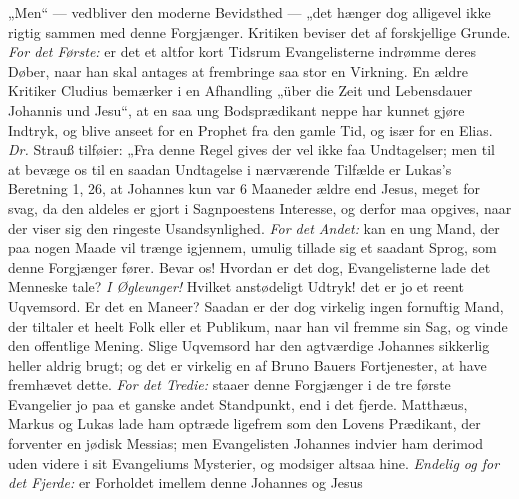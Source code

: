 \documentclass[12pt,a4paper]{book}
\begin{document}
„Men“ --- vedbliver den moderne Bevidsthed --- „det hænger dog alligevel ikke
rigtig sammen med denne Forgjænger. Kritiken beviser det af forskjellige Grunde.
\emph{For det Første:} er det et altfor kort Tidsrum Evangelisterne indrømme
deres Døber, naar han skal antages at frembringe saa stor en Virkning. En ældre
Kritiker Cludius bemærker i en Afhandling „über die Zeit und Lebensdauer
Johannis und Jesu“, at en saa ung Bodsprædikant neppe har kunnet gjøre Indtryk,
og blive anseet for en Prophet fra den gamle Tid, og især for en Elias.
\textit{Dr.} Strauß tilføier: „Fra denne Regel gives der vel ikke faa
Undtagelser; men til at bevæge os til en saadan Undtagelse i nærværende Tilfælde
er Lukas's Beretning 1, 26, at Johannes kun var 6 Maaneder ældre end Jesus, meget
for svag, da den aldeles er gjort i Sagnpoestens Interesse, og derfor maa
opgives, naar der viser sig den ringeste Usandsynlighed.
\emph{For det Andet:} kan en ung Mand, der paa nogen Maade vil trænge igjennem,
umulig tillade sig et saadant
Sprog, som denne Forgjænger fører. Bevar os! Hvordan er det dog, Evangelisterne
lade det Menneske tale? \emph{I Øgleunger!} Hvilket anstødeligt Udtryk! det er jo
et reent Uqvemsord. Er det en Maneer? Saadan er der dog virkelig ingen fornuftig
Mand, der tiltaler et heelt Folk eller et Publikum, naar han vil fremme sin Sag,
og vinde den offentlige Mening. Slige Uqvemsord har den agtværdige Johannes
sikkerlig heller aldrig brugt; og det er virkelig en af Bruno Bauers
Fortjenester, at have fremhævet dette. \emph{For det Tredie:} staaer denne
Forgjænger i de tre første Evangelier jo paa et ganske andet Standpunkt, end i
det fjerde. Matthæus, Markus og Lukas lade ham optræde ligefrem som den Lovens
Prædikant, der forventer en jødisk Messias; men Evangelisten Johannes indvier ham
derimod uden videre i sit Evangeliums Mysterier, og modsiger altsaa hine.
\emph{Endelig og for det Fjerde:} er Forholdet imellem denne Johannes og Jesus
\end{document}
